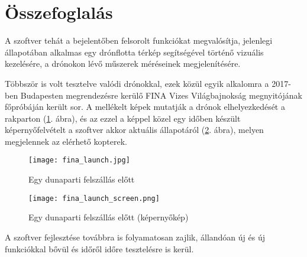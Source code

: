 \section{Összefoglalás}

A szoftver tehát a bejelentőben felsorolt funkciókat megvalósítja, jelenlegi
állapotában alkalmas egy drónflotta térkép segítségével történő vizuális
kezelésére, a drónokon lévő műszerek méréseinek megjelenítésére.

Többször is volt tesztelve valódi drónokkal, ezek közül egyik alkalomra a
2017-ben Budapesten megrendezésre kerülő FINA Vizes Világbajnokság megnyitójának
főpróbáján került sor. A mellékelt képek mutatják a drónok elhelyezkedését a
rakparton (\ref{fig:fina_launch}. ábra), és az ezzel a képpel közel egy időben készült
képernyőfelvételt a szoftver akkor aktuális állapotáról
(\ref{fig:fina_launch_screen}. ábra), melyen megjelennek az elérhető kopterek.

\begin{figure}[H]
  \center
  \texttt{[image: fina\_launch.jpg]}
  \caption{Egy dunaparti felszállás előtt}
  \label{fig:fina_launch}
\end{figure}

\begin{figure}[H]
  \center
  \texttt{[image: fina\_launch\_screen.png]}
  \caption{Egy dunaparti felszállás előtt (képernyőkép)}
  \label{fig:fina_launch_screen}
\end{figure}

A szoftver fejlesztése továbbra is folyamatosan zajlik, állandóan új és új
funkciókkal bővül és időről időre tesztelésre is kerül.
